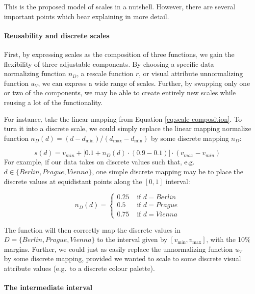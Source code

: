 \documentclass[
]{book}
\theoremstyle{definition}
\theoremstyle{definition}
\theoremstyle{definition}
\theoremstyle{definition}
\theoremstyle{remark}
\begin{document}
This is the proposed model of scales in a nutshell. However, there are several important points which bear explaining in more detail.

\paragraph{Reusability and discrete scales}\label{reusability-and-discrete-scales}

First, by expressing scales as the composition of three functions, we gain the flexibility of three adjustable components. By choosing a specific data normalizing function \(n_D\), a rescale function \(r\), or visual attribute unnormalizing function \(u_V\), we can express a wide range of scales. Further, by swapping only one or two of the components, we may be able to create entirely new scales while reusing a lot of the functionality.

For instance, take the linear mapping from Equation \eqref{eq:scale-composition}. To turn it into a discrete scale, we could simply replace the linear mapping normalize function \(n_D(d) = (d - d_{\min}) / (d_{\max} - d_{\min})\) by some discrete mapping \(n_D\):

\[s(d) = v_{min} + \bigg[ 0.1 + n_D(d) \cdot (0.9 - 0.1) \bigg] \cdot (v_{max} - v_{min})\]
For example, if our data takes on discrete values such that, e.g.~\(d \in \{ Berlin, Prague, Vienna \}\), one simple discrete mapping may be to place the discrete values at equidistant points along the \([0, 1]\) interval:

\[n_D(d) = \begin{cases} 0.25 & \text{ if } d = Berlin \\ 0.5 & \text{ if } d = Prague \\ 0.75 & \text{ if } d = Vienna  \end{cases}\]

The function will then correctly map the discrete values in \(D = \{ Berlin, Prague, Vienna \}\) to the interval given by \([v_{\min}, v_{\max}]\), with the 10\% margins. Further, we could just as easily replace the unnormalizing function \(u_V\) by some discrete mapping, provided we wanted to scale to some discrete visual attribute values (e.g.~to a discrete colour palette).

\paragraph{The intermediate interval}\label{the-intermediate-interval}
\end{document}
